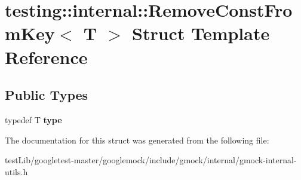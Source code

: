 \hypertarget{structtesting_1_1internal_1_1RemoveConstFromKey}{}\section{testing\+:\+:internal\+:\+:Remove\+Const\+From\+Key$<$ T $>$ Struct Template Reference}
\label{structtesting_1_1internal_1_1RemoveConstFromKey}
\subsection*{Public Types}
\begin{DoxyCompactItemize}
\item 
\mbox{\label{structtesting_1_1internal_1_1RemoveConstFromKey_ab657b0a0fe4ebc499d27011f73c794c1}} 
typedef T {\bfseries type}
\end{DoxyCompactItemize}


The documentation for this struct was generated from the following file\+:\begin{DoxyCompactItemize}
\item 
test\+Lib/googletest-\/master/googlemock/include/gmock/internal/gmock-\/internal-\/utils.\+h\end{DoxyCompactItemize}
